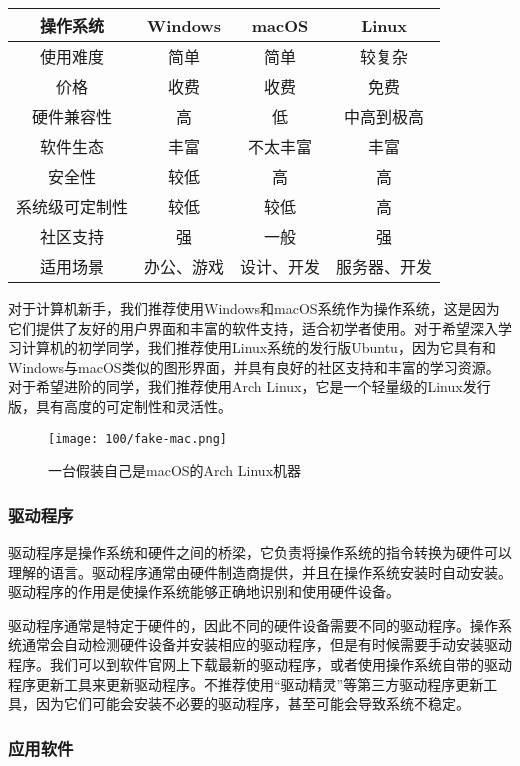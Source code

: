 \begin{table}[ht]
  \centering
  \begin{tabular}{c|ccc}
    \toprule
    操作系统 & Windows & macOS & Linux \\
    \midrule
    使用难度 & 简单 & 简单 & 较复杂 \\
    价格 & 收费 & 收费 & 免费 \\
    硬件兼容性 & 高 & 低 & 中高到极高 \\
    软件生态 & 丰富 & 不太丰富 & 丰富 \\
    安全性 & 较低 & 高 & 高 \\
    系统级可定制性 & 较低 & 较低 & 高 \\
    社区支持 & 强 & 一般 & 强 \\
    适用场景 & 办公、游戏 & 设计、开发 & 服务器、开发 \\
    \bottomrule
  \end{tabular}
\end{table}

对于计算机新手，我们推荐使用Windows和macOS系统作为操作系统，这是因为它们提供了友好的用户界面和丰富的软件支持，适合初学者使用。对于希望深入学习计算机的初学同学，我们推荐使用Linux系统的发行版Ubuntu，因为它具有和Windows与macOS类似的图形界面，并具有良好的社区支持和丰富的学习资源。对于希望进阶的同学，我们推荐使用Arch Linux，它是一个轻量级的Linux发行版，具有高度的可定制性和灵活性。

\begin{figure}[ht]
  \centering
  \texttt{[image: 100/fake-mac.png]}
  \caption{一台假装自己是macOS的Arch Linux机器}
\end{figure}

\subsubsection{驱动程序}

驱动程序是操作系统和硬件之间的桥梁，它负责将操作系统的指令转换为硬件可以理解的语言。驱动程序通常由硬件制造商提供，并且在操作系统安装时自动安装。驱动程序的作用是使操作系统能够正确地识别和使用硬件设备。

驱动程序通常是特定于硬件的，因此不同的硬件设备需要不同的驱动程序。操作系统通常会自动检测硬件设备并安装相应的驱动程序，但是有时候需要手动安装驱动程序。我们可以到软件官网上下载最新的驱动程序，或者使用操作系统自带的驱动程序更新工具来更新驱动程序。不推荐使用“驱动精灵”等第三方驱动程序更新工具，因为它们可能会安装不必要的驱动程序，甚至可能会导致系统不稳定。

\subsubsection{应用软件}

